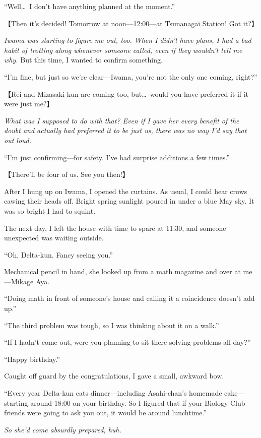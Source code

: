 \documentclass[
    a4paper,
    12pt,
    twoside,
    openany,
    UTF8,
    fontset=windows
]{ctexbook}
\begin{document}
``Well\dots\ I don't have anything planned at the moment.''

【Then it's decided! Tomorrow at noon---12:00---at Tsunanagai Station! Got it?】

\textit{Iwama was starting to figure me out, too. When I didn't have plans, I had a bad habit of trotting along whenever someone called, even if they wouldn't tell me why.} But this time, I wanted to confirm something.

``I'm fine, but just so we're clear---Iwama, you're not the only one coming, right?''

【Rei and Mizasaki-kun are coming too, but\dots\ would you have preferred it if it were just me?】

\textit{What was I supposed to do with that? Even if I gave her every benefit of the doubt and actually had preferred it to be just us, there was no way I'd say that out loud.}

``I'm just confirming---for safety. I've had surprise additions a few times.''

【There'll be four of us. See you then!】

After I hung up on Iwama, I opened the curtains. As usual, I could hear crows cawing their heads off. Bright spring sunlight poured in under a blue May sky.
It was so bright I had to squint.

The next day, I left the house with time to spare at 11:30, and someone unexpected was waiting outside.

``Oh, Delta-kun. Fancy seeing you.''

Mechanical pencil in hand, she looked up from a math magazine and over at me---Mikage Aya.

``Doing math in front of someone's house and calling it a coincidence doesn't add up.''

``The third problem was tough, so I was thinking about it on a walk.''

``If I hadn't come out, were you planning to sit there solving problems all day?''

``Happy birthday.''

Caught off guard by the congratulations, I gave a small, awkward bow.

``Every year Delta-kun eats dinner---including Asahi-chan's homemade cake---starting around 18:00 on your birthday. So I figured that if your Biology Club friends were going to ask you out, it would be around lunchtime.''

\textit{So she'd come absurdly prepared, huh.}
\end{document}
